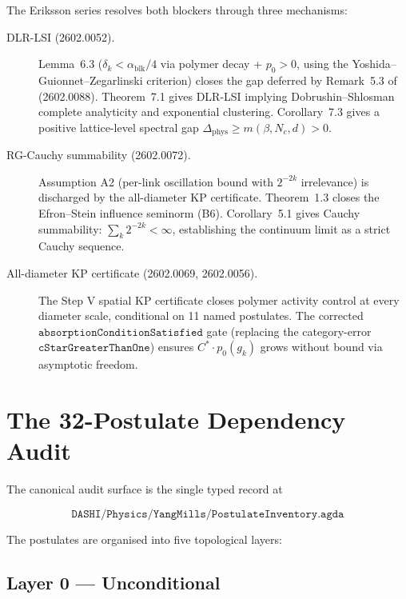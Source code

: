 \documentclass[11pt,a4paper]{article}
\begin{document}
The Eriksson series resolves both blockers through three mechanisms:

\begin{description}
\item[DLR-LSI (2602.0052).]
  Lemma~6.3 ($\delta_k < \alpha_{\mathrm{blk}}/4$ via polymer decay +
  $p_0 > 0$, using the Yoshida--Guionnet--Zegarlinski criterion) closes the
  gap deferred by Remark~5.3 of (2602.0088).  Theorem~7.1 gives DLR-LSI
  implying Dobrushin--Shlosman complete analyticity and exponential
  clustering.  Corollary~7.3 gives a positive lattice-level spectral gap
  $\Delta_{\mathrm{phys}} \geq m(\beta, N_c, d) > 0$.

\item[RG-Cauchy summability (2602.0072).]
  Assumption A2 (per-link oscillation bound with $2^{-2k}$ irrelevance) is
  discharged by the all-diameter KP certificate.  Theorem~1.3 closes the
  Efron--Stein influence seminorm (B6).  Corollary~5.1 gives Cauchy
  summability: $\sum_k 2^{-2k} < \infty$, establishing the continuum limit as
  a strict Cauchy sequence.

\item[All-diameter KP certificate (2602.0069, 2602.0056).]
  The Step V spatial KP certificate closes polymer activity control at every
  diameter scale, conditional on 11 named postulates.  The corrected
  $\texttt{absorptionConditionSatisfied}$ gate (replacing the category-error
  $\texttt{cStarGreaterThanOne}$) ensures $C^* \cdot p_0(g_k)$ grows without
  bound via asymptotic freedom.
\end{description}

\section{The 32-Postulate Dependency Audit}

The canonical audit surface is the single typed record at

\[
\texttt{DASHI/Physics/YangMills/PostulateInventory.agda}
\]

The postulates are organised into five topological layers:

\subsection{Layer 0 --- Unconditional}
\end{document}

